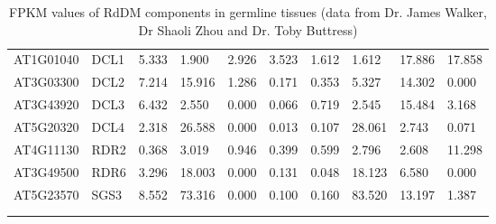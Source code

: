 \begin{landscape}
\begin{longtable}{l|l|lll|ll|lll}
AT1G01040 & DCL1     & 5.333  & 1.900   & 2.926    & 3.523  & 1.612    & 1.612   & 17.886 & 17.858   \\
AT3G03300 & DCL2     & 7.214  & 15.916  & 1.286    & 0.171  & 0.353    & 5.327   & 14.302 & 0.000    \\
AT3G43920 & DCL3     & 6.432  & 2.550   & 0.000    & 0.066  & 0.719    & 2.545   & 15.484 & 3.168    \\
AT5G20320 & DCL4     & 2.318  & 26.588  & 0.000    & 0.013  & 0.107    & 28.061  & 2.743  & 0.071    \\ \hline
AT4G11130 & RDR2     & 0.368  & 3.019   & 0.946    & 0.399  & 0.599    & 2.796   & 2.608  & 11.298   \\
AT3G49500 & RDR6     & 3.296  & 18.003  & 0.000    & 0.131  & 0.048    & 18.123  & 6.580  & 0.000    \\ \hline
AT5G23570 & SGS3     & 8.552  & 73.316  & 0.000    & 0.100  & 0.160    & 83.520  & 13.197 & 1.387  \\
\caption{FPKM values of RdDM components in germline tissues (data from Dr. James Walker, Dr Shaoli Zhou and Dr. Toby Buttress)}\\
\label{tab:FPKM_germ}\\
\end{longtable}
\end{landscape}

